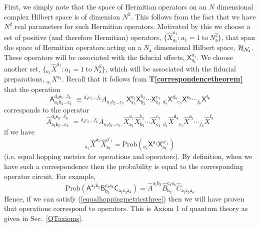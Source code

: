 \documentclass[10pt]{article}
\begin{document}
First, we simply note that the space of Hermitian operators on an $N$ dimensional complex Hilbert space is of dimension $N^2$.  This follows from the fact that we have $N^2$ real parameters for such Hermitian operators.  Motivated by this we choose a set of positive (and therefore Hermitian) operators, $\{\hat X_\mathsf{a_1}^{a_1}: a_1=1 ~\text{to}~N_\mathsf{a}^2\}$, that span the space of Hermitian operators acting on a $N_\mathsf{a}$ dimensional Hilbert space, $\cal{H}_{N_\mathsf{a}}$.  These operators will be associated with the fiducial effects, $\mathsf{X}_\mathsf{a_1}^{a_1}$.  We choose another set, $\{{}_{a_1}\hat X^\mathsf{a_1}:a_1=1~\text{to}~ N_\mathsf{a}^2\}$, which will be associated with the fiducial preparations, ${}_{a_1} X^\mathsf{a_1}$.  Recall that it follows from {\bf T\ref{correspondencetheorem}} that the operation
\begin{equation}\label{operationcorrespondsthree}
\mathsf{A_{a_1b_2\dots c_3}^{d_4e_5\dots f_6}} \,\,\equiv {}^{d_4e_5\dots f_6}\!A_{a_1b_2\dots c_3}\,\, \mathsf{X}_\mathsf{a_1}^{a_1} \mathsf{X}_\mathsf{b_2}^{b_2} \cdots \mathsf{X}_\mathsf{c_3}^{c_3} \,\,{}_{d_4}\!\mathsf{X}^\mathsf{d_4}{}_{e_5}\!\mathsf{X}^\mathsf{e_5}\cdots {}_{f_6}\!\mathsf{X}^\mathsf{f_6}
\end{equation}
corresponds to the operator
\begin{equation}\label{operatorcorrespondsthree}
\hat A_\mathsf{a_1b_2\dots c_3}^\mathsf{d_4e_5\dots f_6} \,\,= {}^{d_4e_5\dots f_6}\!A_{a_1b_2\dots c_3}\,\, \hat {X}_\mathsf{a_1}^{a_1} \hat{X}_\mathsf{b_2}^{b_2} \cdots \hat{X}_\mathsf{c_3}^{c_3} \,\,{}_{d_4}\!\hat{X}^\mathsf{d_4}{}_{e_5}\!\hat{X}^\mathsf{e_5}\cdots {}_{f_6}\!\hat{X}^\mathsf{f_6}
\end{equation}
if we have
\begin{equation}\label{equalhoppingmetricsthree}
{}_{a_1}\! \hat X^\mathsf{a_1}\hat X_\mathsf{a_1}^{a'_1}=\text{Prob}({}_{a_1}\! \mathsf{X}^\mathsf{a_1}\mathsf{X}_\mathsf{a_1}^{a'_1})
\end{equation}
(i.e. equal hopping metrics for operations and operators).  By definition, when we have such a correspondence then the probability is equal to the corresponding operator circuit.  For example,
\begin{equation}
\text{Prob}(\mathsf{A}^\mathsf{a_1b_2}\mathsf{B}_\mathsf{b_2}^\mathsf{c_3a_4}\mathsf{C}_\mathsf{a_1c_3a_4})
=\hat{A}^\mathsf{a_1b_2}\hat{B}_\mathsf{b_2}^\mathsf{c_3a_4}\hat{C}_\mathsf{a_1c_3a_4}
\end{equation}
Hence, if we can satisfy (\ref{equalhoppingmetricsthree}) then we will have proven that operations correspond to operators.  This is Axiom 1 of quantum theory as given in Sec.\ \ref{QTaxioms}.
\end{document}
